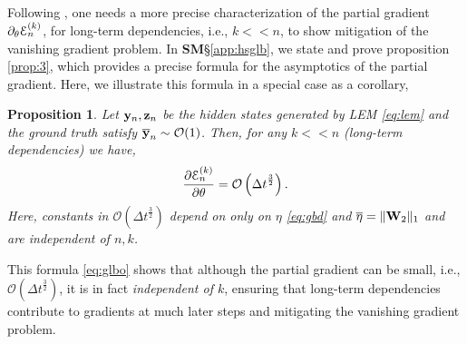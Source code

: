 \documentclass{article} \usepackage{iclr2022_conference,times}
\newcommand{\by}{{\bf y}}
\newcommand{\bz}{{\bf z}}
\newcommand{\bW}{{\bf W}}
\newcommand{\ord}{{\mathcal O}}
\newcommand{\Dt}{{\Delta t}}
\newcommand{\E}{\EuScript{E}}
\newtheorem{proposition}[theorem]{Proposition}
\begin{document}
Following \cite{vanish_grad}, one needs a more precise characterization of the partial gradient 
$\partial_{\theta} \E^{(k)}_n$, for long-term dependencies, i.e., $k << n$, to show mitigation of the vanishing gradient problem. In {\bf SM}\S\ref{app:hsglb}, we state and prove proposition \ref{prop:3}, which provides a precise formula for the asymptotics of the partial gradient. Here, we illustrate this formula in a special case as a corollary,
\begin{proposition}
\label{prop:3cor}
Let $\by_n,\bz_n$ be the hidden states generated by LEM \eqref{eq:lem} and the ground truth satisfy $\overline{\by}_n \sim \ord(1)$.
Then, for any $k << n$ (long-term dependencies) we have,
\begin{equation}
\label{eq:glbo}
 \frac{\partial \E^{(k)}_n}{\partial \theta} = \ord\left(\Dt^{\frac{3}{2}}\right) . 
\end{equation}
Here, constants in $\ord(\Dt^{\frac{3}{2}})$ depend on only on $\eta$ \eqref{eq:gbd} and $\overline{\eta} = \|\bW_2\|_{1}$ and are independent of $n,k$.
\end{proposition}
This formula \eqref{eq:glbo} shows that although the partial gradient can be small, i.e.,
$\ord(\Dt^{\frac{3}{2}})$, it is in fact \emph{independent of $k$}, ensuring that long-term dependencies contribute to gradients at much later steps and mitigating the vanishing gradient problem.
\end{document}
